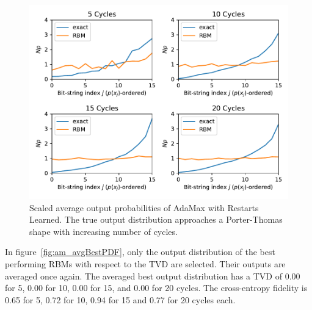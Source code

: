 \begin{figure}[H]
  \centering
  \includegraphics[width=\textwidth]{figures/results/AM-restarts-learned/avgPDF.pdf}
  \caption[Scaled average output probabilities of AdaMax with Restarts Learned]{
    Scaled average output probabilities of AdaMax with Restarts Learned. The true 
    output distribution approaches a Porter-Thomas shape with increasing number of cycles.}
  \label{fig:am_avgPDF}
\end{figure}

In figure~\ref{fig:am_avgBestPDF}, only the output distribution of the best performing RBMs with respect to the 
TVD are selected. Their outputs are averaged once again. The averaged best output distribution 
has a TVD of 0.00 for 5, 0.00 for 10, 0.00 for 15, and 0.00 for 20 
cycles. The cross-entropy fidelity is 0.65 for 5, 0.72 for 10, 0.94 for 15 and 0.77 for 20 cycles each. 

